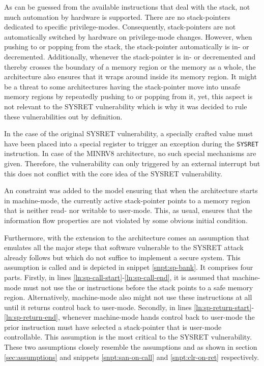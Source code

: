 As can be guessed from the available instructions that deal with the stack, not much automation by hardware is supported.
There are no stack-pointers dedicated to specific privilege-modes.
Consequently, stack-pointers are not automatically switched by hardware on privilege-mode changes.
However, when pushing to or popping from the stack, the stack-pointer automatically is in- or decremented.
Additionally, whenever the stack-pointer is in- or decremented and thereby crosses the boundary of a memory region or the memory as a whole, the architecture also ensures that it wraps around inside its memory region.
It might be a threat to some architectures having the stack-pointer move into unsafe memory regions by repeatedly pushing to or popping from it, yet, this aspect is not relevant to the SYSRET vulnerability which is why it was decided to rule these vulnerabilities out by definition.

In the case of the original SYSRET vulnerability, a specially crafted value must have been placed into a special register to trigger an exception during the \lstinline{SYSRET} instruction.
In case of the MINRV8 architecture, no such special mechanisms are given.
Therefore, the vulnerability can only triggered by an external interrupt but this does not conflict with the core idea of the SYSRET vulnerability.

An  constraint was added to the model ensuring that when the architecture starts in machine-mode, the currently active stack-pointer points to a memory region that is neither read- nor writable to user-mode.
This, as usual, ensures that the information flow properties are not violated by some obvious initial condition.

Furthermore, with the extension to the architecture comes an assumption that emulates all the major steps that software vulnerable to the SYSRET attack already follows but which do not suffice to implement a secure system.
This assumption is called  and is depicted in snippet \ref{snpt:sp-bank}.
It comprises four parts.
Firstly, in lines \ref{ln:sp-call-start}-\ref{ln:sp-call-end}, it is assumed that machine-mode must not use the  or  instructions before the stack points to a safe memory region.
Alternatively, machine-mode also might not use these instructions at all until it returns control back to user-mode.
Secondly, in lines \ref{ln:sp-return-start}-\ref{ln:sp-return-end}, whenever machine-mode hands control back to user-mode the prior instruction must have selected a stack-pointer that is user-mode controllable.
This assumption is the most critical to the SYSRET vulnerability.
These two assumptions closely resemble the assumptions  and  as shown in section \ref{sec:assumptions} and snippets \ref{snpt:san-on-call} and \ref{snpt:clr-on-ret} respectively.

